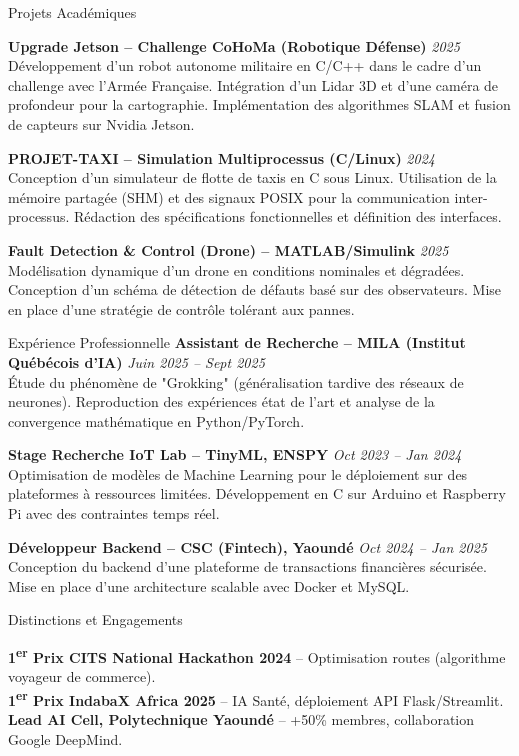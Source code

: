 \documentclass[10pt]{resume}
\begin{document}
\begin{rSection}{Projets Académiques}

{\bf Upgrade Jetson -- Challenge CoHoMa (Robotique Défense)} \hfill {\em 2025}\\
Développement d'un robot autonome militaire en C/C++ dans le cadre d'un challenge avec l'Armée Française. Intégration d'un Lidar 3D et d'une caméra de profondeur pour la cartographie. Implémentation des algorithmes SLAM et fusion de capteurs sur Nvidia Jetson.

{\bf PROJET-TAXI -- Simulation Multiprocessus (C/Linux)} \hfill {\em 2024}\\
Conception d'un simulateur de flotte de taxis en C sous Linux. Utilisation de la mémoire partagée (SHM) et des signaux POSIX pour la communication inter-processus. Rédaction des spécifications fonctionnelles et définition des interfaces.

{\bf Fault Detection \& Control (Drone) -- MATLAB/Simulink} \hfill {\em 2025}\\
Modélisation dynamique d'un drone en conditions nominales et dégradées. Conception d'un schéma de détection de défauts basé sur des observateurs. Mise en place d'une stratégie de contrôle tolérant aux pannes.

\end{rSection}

\begin{rSection}{Expérience Professionnelle}
{\bf Assistant de Recherche -- MILA (Institut Québécois d'IA)} \hfill {\em Juin 2025 -- Sept 2025}\\
Étude du phénomène de "Grokking" (généralisation tardive des réseaux de neurones). Reproduction des expériences état de l'art et analyse de la convergence mathématique en Python/PyTorch.

{\bf Stage Recherche IoT Lab -- TinyML, ENSPY} \hfill {\em Oct 2023 -- Jan 2024}\\
Optimisation de modèles de Machine Learning pour le déploiement sur des plateformes à ressources limitées. Développement en C sur Arduino et Raspberry Pi avec des contraintes temps réel.

{\bf Développeur Backend -- CSC (Fintech), Yaoundé} \hfill {\em Oct 2024 -- Jan 2025}\\
Conception du backend d'une plateforme de transactions financières sécurisée. Mise en place d'une architecture scalable avec Docker et MySQL.
\end{rSection}

\begin{rSection}{Distinctions et Engagements}

\textbf{1\textsuperscript{er} Prix CITS National Hackathon 2024} -- Optimisation routes (algorithme voyageur de commerce). \\
\textbf{1\textsuperscript{er} Prix IndabaX Africa 2025} -- IA Santé, déploiement API Flask/Streamlit. \\
\textbf{Lead AI Cell, Polytechnique Yaoundé} -- +50\% membres, collaboration Google DeepMind.
\end{rSection}
\end{document}
